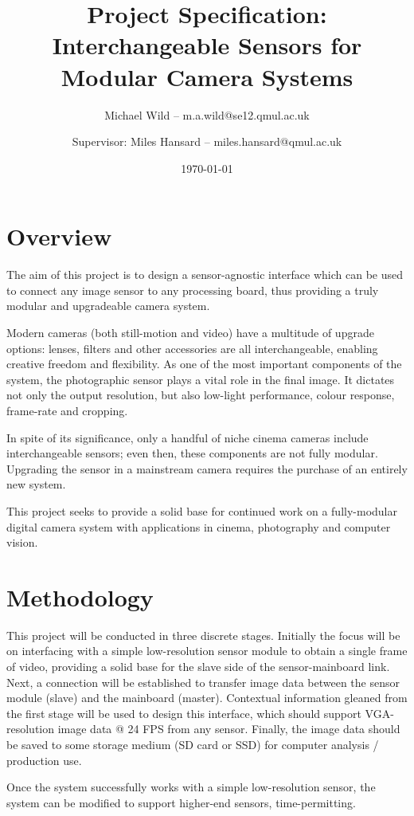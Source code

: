 \documentclass[a4paper]{article}
\title{Project Specification: Interchangeable Sensors for Modular Camera Systems}
\author{Michael Wild – m.a.wild@se12.qmul.ac.uk \and Supervisor: Miles Hansard – miles.hansard@qmul.ac.uk}
\date{\today}
\begin{document}
\maketitle

\section{Overview}

The aim of this project is to design a sensor-agnostic interface which can be used to connect any image sensor to any processing board, thus providing a truly modular and upgradeable camera system.

Modern cameras (both still-motion and video) have a multitude of upgrade options: lenses, filters and other accessories are all interchangeable, enabling creative freedom and flexibility. As one of the most important components of the system, the photographic sensor plays a vital role in the final image. It dictates not only the output resolution, but also low-light performance, colour response, frame-rate and cropping. 

In spite of its significance, only a handful of niche cinema cameras include interchangeable sensors; even then, these components are not fully modular. Upgrading the sensor in a mainstream camera requires the purchase of an entirely new system.

This project seeks to provide a solid base for continued work on a fully-modular digital camera system with applications in cinema, photography and computer vision.

\section{Methodology}

This project will be conducted in three discrete stages. Initially the focus will be on interfacing with a simple low-resolution sensor module to obtain a single frame of video, providing a solid base for the slave side of the sensor-mainboard link. Next, a connection will be established to transfer image data between the sensor module (slave) and the mainboard (master). Contextual information gleaned from the first stage will be used to design this interface, which should support VGA-resolution image data @ 24 FPS from any sensor. Finally, the image data should be saved to some storage medium (SD card or SSD) for computer analysis / production use.

Once the system successfully works with a simple low-resolution sensor, the system can be modified to support higher-end sensors, time-permitting.
\end{document}
